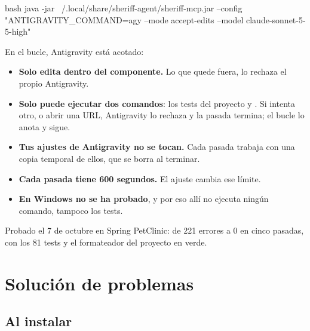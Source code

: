 \documentclass[11pt,a4paper]{article}
\begin{document}
\begin{command}{bash}
java -jar ~/.local/share/sheriff-agent/sheriff-mcp.jar --config "ANTIGRAVITY_COMMAND=agy --mode accept-edits --model claude-sonnet-5-5-high"
\end{command}

En el bucle, Antigravity está acotado:

\begin{itemize}
  \item \textbf{Solo edita dentro del componente.} Lo que quede fuera, lo
        rechaza el propio Antigravity.
  \item \textbf{Solo puede ejecutar dos comandos}: los tests del proyecto y
        . Si intenta otro, o abrir una URL, Antigravity lo rechaza
        y la pasada termina; el bucle lo anota y sigue.
  \item \textbf{Tus ajustes de Antigravity no se tocan.} Cada pasada trabaja
        con una copia temporal de ellos, que se borra al terminar.
  \item \textbf{Cada pasada tiene 600 segundos.} El ajuste
         cambia ese límite.
  \item \textbf{En Windows no se ha probado}, y por eso allí no ejecuta ningún
        comando, tampoco los tests.
\end{itemize}

\begin{note}
Probado el 7 de octubre en Spring PetClinic: de 221 errores a 0 en cinco
pasadas, con los 81 tests y el formateador del proyecto en verde.
\end{note}

\section{Solución de problemas}
\label{sec:problemas}

\newcommand\problem[2]{\par\addvspace{0.5\baselineskip}\noindent\textbf{\color{pbbrand}#1}\par\nopagebreak\vspace{-0.45\baselineskip}\noindent\hangindent=1.2em\hangafter=0 #2\par}

\subsection{Al instalar}
\end{document}
